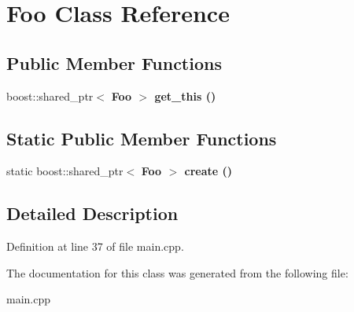 \section{Foo Class Reference}
\label{classFoo}
\subsection*{Public Member Functions}
\begin{CompactItemize}
\item 
boost::shared\_\-ptr$<$ \bf{Foo} $>$ \bf{get\_\-this} ()\label{classFoo_04ffc8490e173b4c5d7b8654361ff259}

\end{CompactItemize}
\subsection*{Static Public Member Functions}
\begin{CompactItemize}
\item 
static boost::shared\_\-ptr$<$ \bf{Foo} $>$ \bf{create} ()\label{classFoo_bed3e640ceb480b6c951d2cf95f850cf}

\end{CompactItemize}


\subsection{Detailed Description}




Definition at line 37 of file main.cpp.

The documentation for this class was generated from the following file:\begin{CompactItemize}
\item 
main.cpp\end{CompactItemize}
